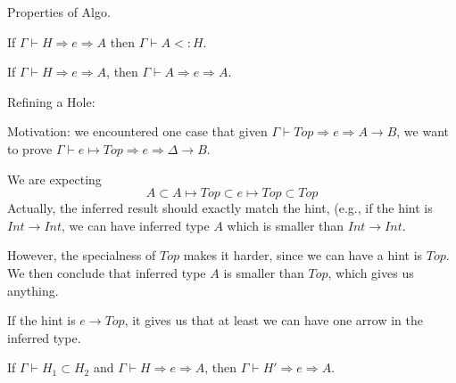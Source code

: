 \begin{frame}{Properties of Algo.}
\begin{lemma}
If $\Gamma \vdash H \Rightarrow e \Rightarrow A$ then $\Gamma \vdash A <: H$.
\end{lemma}

\begin{lemma}
If $\Gamma \vdash H \Rightarrow e \Rightarrow A$, then $\Gamma \vdash A \Rightarrow e \Rightarrow A$.
\end{lemma}
\end{frame}

\begin{frame}{Refining a Hole: }

Motivation: we encountered one case that given $\Gamma \vdash Top \Rightarrow e \Rightarrow A \rightarrow B$, we want to prove $\Gamma \vdash \boxed{e} \mapsto Top \Rightarrow e \Rightarrow \Delta \rightarrow B$.

We are expecting
$$
A \subset A \mapsto Top \subset \boxed{e} \mapsto Top \subset Top
$$
Actually, the inferred result should exactly match the hint, (e.g., if the hint is $Int \rightarrow Int$, we can have inferred type $A$ which is smaller than $Int \rightarrow Int$.

However, the specialness of $Top$ makes it harder, since we can have a hint is $Top$. We then conclude that inferred type $A$ is smaller than $Top$, which gives us anything.

If the hint is $\boxed{e} \rightarrow Top$, it gives us that at least we can have one arrow in the inferred type.

\begin{lemma}
If $\Gamma \vdash H_1 \subset H_2$ and $\Gamma \vdash H \Rightarrow e \Rightarrow A$, then $\Gamma \vdash H'  \Rightarrow e \Rightarrow A$.
\end{lemma}

\end{frame}